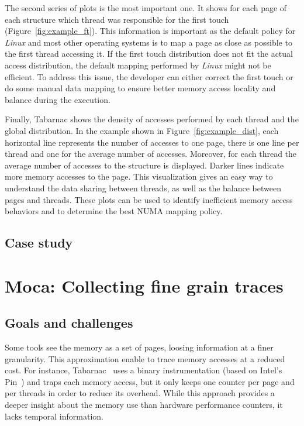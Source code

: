 The second series of plots is the most important one. It
shows for each page of each structure
which thread was responsible for the first touch
(Figure~\ref{fig:example_ft}). This information is important as the
default policy for \emph{Linux} and most other operating systems is to map a page as close as possible to the first
thread accessing it. If the first touch distribution does not fit the actual
access distribution, the default mapping performed by \emph{Linux} might not be
efficient. To address this issue, the developer can either correct the first
touch or do some manual data mapping to ensure better memory access locality and balance
during the execution.

Finally, \gls{Tabarnac} shows the density of accesses performed by each thread and
the global distribution. In the example shown in Figure~\ref{fig:example_dist}, each
horizontal line represents the number of accesses to one page, there is one
line per thread and one for the average number of accesses. Moreover, for each
thread the average number of accesses to the structure is displayed.
Darker lines indicate more memory accesses to the page. This visualization gives an easy way
to understand the data sharing between threads, as well as the balance between pages and
threads. These plots can be used to identify inefficient memory access behaviors and to
determine the best NUMA mapping policy.

\subsection{Case study}



\section{Moca: Collecting fine grain traces}

\subsection{Goals and challenges}


Some tools see the memory as a set of pages, loosing information at a finer
granularity. This approximation enable to trace memory accesses at a reduced
cost. For instance, \gls{Tabarnac}~\cite{Beniamine15TABARNAC} uses a binary
instrumentation (based on Intel's Pin~\cite{Luk05Pin}) and traps each
memory access, but it only keeps one counter per page and per threads in order to
reduce its overhead. While this approach provides a deeper insight about the
memory use than hardware performance counters, it lacks temporal information.





